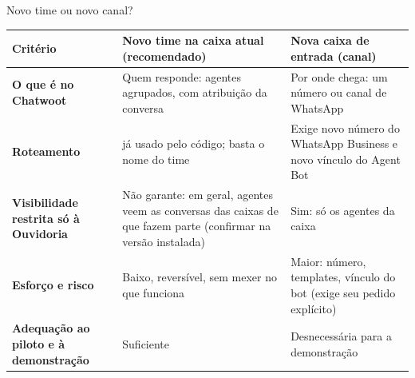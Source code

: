 \documentclass[aspectratio=169,10pt]{beamer}
\newcommand{\code}[1]{\texttt{\detokenize{#1}}}
\begin{document}
\begin{frame}{Novo time ou novo canal?}\label{pg:time}
\scriptsize
\begin{tabularx}{\linewidth}{@{}>{\bfseries}p{3.6cm}>{\raggedright\arraybackslash}X>{\raggedright\arraybackslash}X@{}}
\toprule
Critério & \textcolor{rosa}{Novo time na caixa atual} (recomendado) & Nova caixa de entrada (canal) \\
\midrule
O que é no Chatwoot & Quem responde: agentes agrupados, com atribuição da conversa & Por onde chega: um número ou canal de WhatsApp \\
Roteamento & \code{assign_team} já usado pelo código; basta o nome do time & Exige novo número do WhatsApp Business e novo vínculo do Agent Bot \\
Visibilidade restrita só à Ouvidoria & \alert{Não garante}: em geral, agentes veem as conversas das caixas de que fazem parte (confirmar na versão instalada) & Sim: só os agentes da caixa \\
Esforço e risco & Baixo, reversível, sem mexer no que funciona & Maior: número, templates, vínculo do bot (exige seu pedido explícito) \\
Adequação ao piloto e à demonstração & Suficiente & Desnecessária para a demonstração \\
\bottomrule
\end{tabularx}
\vskip5pt
\end{frame}
\end{document}
